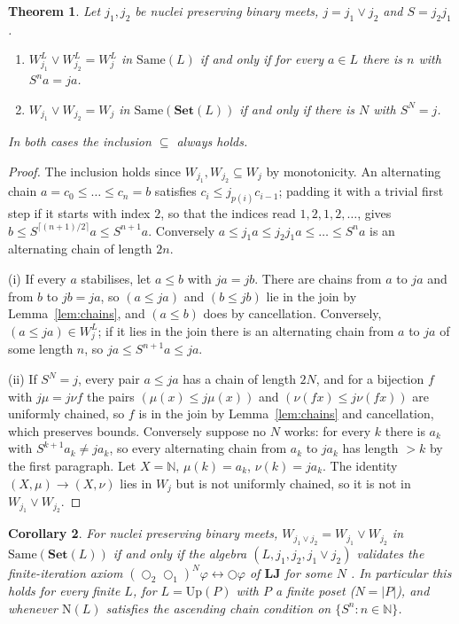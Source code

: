 \documentclass[11pt]{amsart}
\newtheorem{thm}{Theorem}[section]
\newtheorem{cor}[thm]{Corollary}
\theoremstyle{definition}
\newcommand{\Up}{\mathrm{Up}}
\newcommand{\Nuc}{\mathrm{N}}
\newcommand{\Same}{\mathrm{Same}}
\newcommand{\FSet}{\mathbf{Set}}
\newcommand{\LLJ}{\mathbf{LJ}}
\newcommand{\lax}{\bigcirc}
\newcommand{\laxa}{\bigcirc_1}
\newcommand{\laxb}{\bigcirc_2}
\begin{document}
\begin{thm}\label{thm:joins}
Let $j_1,j_2$ be nuclei preserving binary meets, $j=j_1\vee j_2$ and
$S=j_2j_1$.
\begin{enumerate}
\item[(i)] $W^L_{j_1}\vee W^L_{j_2}=W^L_j$ in $\Same(L)$ if and only if for
every $a\in L$ there is $n$ with $S^na=ja$.
\item[(ii)] $W_{j_1}\vee W_{j_2}=W_j$ in $\Same(\FSet(L))$ if and only if
there is $N$ with $S^N=j$.
\end{enumerate}
In both cases the inclusion $\subseteq$ always holds.
\end{thm}
\begin{proof}
The inclusion holds since $W_{j_1},W_{j_2}\subseteq W_j$ by monotonicity.
An alternating chain $a=c_0\le\dots\le c_n=b$ satisfies
$c_i\le j_{p(i)}c_{i-1}$; padding it with a trivial first step if it starts
with index $2$, so that the indices read $1,2,1,2,\dots$, gives
$b\le S^{\lceil(n+1)/2\rceil}a\le S^{n+1}a$. Conversely
$a\le j_1a\le j_2j_1a\le\dots\le S^na$ is an alternating chain of length $2n$.

(i) If every $a$ stabilises, let $a\le b$ with $ja=jb$. There are chains
from $a$ to $ja$ and from $b$ to $jb=ja$, so $(a\le ja)$ and $(b\le jb)$ lie
in the join by Lemma~\ref{lem:chains}, and $(a\le b)$ does by
cancellation. Conversely, $(a\le ja)\in W^L_j$; if it lies in the join there
is an alternating chain from $a$ to $ja$ of some length $n$, so
$ja\le S^{n+1}a\le ja$.

(ii) If $S^N=j$, every pair $a\le ja$ has a chain of length $2N$, and for a
bijection $f$ with $j\mu=j\nu f$ the pairs $(\mu(x)\le j\mu(x))$ and
$(\nu(fx)\le j\nu(fx))$ are uniformly chained, so $f$ is in the join by
Lemma~\ref{lem:chains} and cancellation, which preserves bounds. Conversely
suppose no $N$ works: for every $k$ there is $a_k$ with $S^{k+1}a_k\ne ja_k$,
so every alternating chain from $a_k$ to $ja_k$ has length $>k$ by the
first paragraph. Let $X=\mathbb N$, $\mu(k)=a_k$, $\nu(k)=ja_k$. The identity
$(X,\mu)\to(X,\nu)$ lies in $W_j$ but is not uniformly chained, so it is
not in $W_{j_1}\vee W_{j_2}$.
\end{proof}

\begin{cor}\label{cor:axiom}
For nuclei preserving binary meets, $W_{j_1\vee j_2}=W_{j_1}\vee W_{j_2}$ in
$\Same(\FSet(L))$ if and only if the algebra $(L,j_1,j_2,j_1\vee j_2)$
validates the finite-iteration axiom $(\laxb\laxa)^N\varphi\leftrightarrow
\lax\varphi$ of $\LLJ$ for some $N$ \cite{Laxjoin}. In particular this holds
for every finite $L$, for $L=\Up(P)$ with $P$ a finite poset ($N=|P|$),
and whenever $\Nuc(L)$ satisfies the ascending chain condition on
$\{S^n:n\in\mathbb N\}$.
\end{cor}
\end{document}
